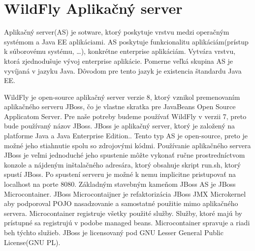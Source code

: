 \section{WildFly Aplikačný server}\label{jbossc}
Aplikačný server(AS) je sotware, ktorý poskytuje vrstvu medzi operačným systémom a Java EE aplikáciami. AS poskytuje funkcionalitu aplikáciám(prístup k súborovému systému, \ldots), konkrétne enterprise aplikáciám. Vytvára vrstvu, ktorá zjednodušuje vývoj enterprise aplikácie. Pomerne veľká skupina AS je vyvíjaná v jazyku Java. Dôvodom pre tento jazyk je existencia štandardu Java EE.

WildFly je open-source aplikačný server verzie 8, ktorý vznikol premenovaním aplikačného serveru JBoss, čo je vlastne skratka pre JavaBeans Open Source Applicatom Server. Pre naše potreby budeme používať WildFly v verzii 7, preto bude používaný názov JBoss. JBoss je aplikačný server, ktorý je založený na platforme Java a Java Enterprise Edition.\cite{jbossbook}. Tento typ AS je open-source, preto je možné jeho stiahnutie spolu so zdrojovými kódmi. Používanie aplikačného servera JBoss je veľmi jednoduché jeho spustenie môžte vykonať ručne prostredníctvom konzole a nájdeným inštalačného adresára, ktorý obsahuje skript run.sh, ktorý spustí JBoss. Po spustení serveru je možné k nemu implicitne pristupovať na localhost na porte 8080. Základným stavebným kameňom JBoss AS je JBoss Microcontainer. JBoss Microcontaijner je refaktorizácia JBoss JMX Microkernel aby podporoval POJO nasadzovanie a samostatné použitie mimo aplikačného servera. Microcontainer registruje všetky použité služby. Služby, ktoré majú by prístupné sa registrujú v podobe managed beans. Microcontainer spravuje a riadi beh týchto služieb. JBoss je licensovaný pod GNU Lesser General Public License(GNU PL).


